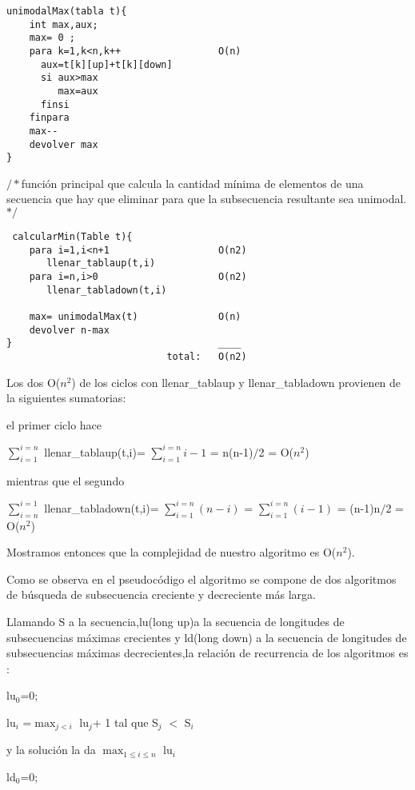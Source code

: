 \begin{verbatim}
unimodalMax(tabla t){
    int max,aux; 	
    max= 0 ;
    para k=1,k<n,k++                 O(n)
	  aux=t[k][up]+t[k][down]
	  si aux>max 
	     max=aux
	  finsi 
	finpara
	max-- 
    devolver max
}
\end{verbatim}


$/*$función principal que calcula la cantidad mínima de elementos de una secuencia que hay que eliminar para que la subsecuencia resultante sea unimodal.$*/$

\begin{verbatim}
 calcularMin(Table t){
    para i=1,i<n+1                   O(n2)
       llenar_tablaup(t,i) 
    para i=n,i>0                     O(n2)
       llenar_tabladown(t,i)
    
    max= unimodalMax(t)              O(n)
    devolver n-max   
}                                    ____
                            total:   O(n2)
\end{verbatim}                       

Los dos O($n^{2}$) de los ciclos con llenar\_tablaup y llenar\_tabladown provienen de la siguientes sumatorias:

el primer ciclo hace

$\sum_{i=1}^{i=n}$ llenar\_tablaup(t,i)= $\sum_{i=1}^{i=n} i-1 $ = n(n-1)$/$2 = O($n^{2}$)

mientras que el segundo

$\sum_{i=n}^{i=1}$ llenar\_tabladown(t,i)= $\sum_{i=1}^{i=n}(n-i)$ = $\sum_{i=1}^{i=n}(i-1)$ = (n-1)n$/$2 = O($n^{2}$)
                       
Mostramos entonces que la complejidad de nuestro algoritmo es O($n^{2}$).



\newline
Como se observa en el pseudocódigo el algoritmo se compone de dos algoritmos de búsqueda de subsecuencia creciente y decreciente más larga.

Llamando S a la secuencia,lu(long up)a la secuencia de longitudes de subsecuencias máximas crecientes  y ld(long down) a la secuencia de longitudes de subsecuencias máximas decrecientes,la relación de recurrencia de los algoritmos es :

lu$_0$=0;

lu$_i$ =$\max_{j<i}$ lu$_j$+ 1  tal que S$_j$ $<$ S$_i$  

y la solución la da $\max_{1\leq i\leq n}$ lu$_i$

ld$_0$=0;


